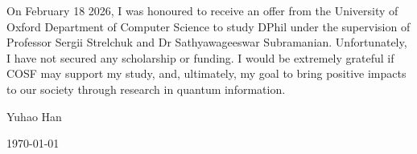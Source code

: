 \documentclass{article}
\theoremstyle{definition}
\theoremstyle{definition}
\theoremstyle{remark}
\begin{document}
On February 18 2026, I was honoured to receive an offer from the University of Oxford Department of Computer Science to study DPhil under the supervision of Professor Sergii Strelchuk and Dr Sathyawageeswar Subramanian. 
Unfortunately, I have not secured any scholarship or funding. I would be extremely grateful if COSF may support my study, and, ultimately, my goal to bring positive impacts to our society through research in quantum information.



\hfill Yuhao Han \hspace{1.6em}

\hfill \today

\printbibliography
\end{document}
